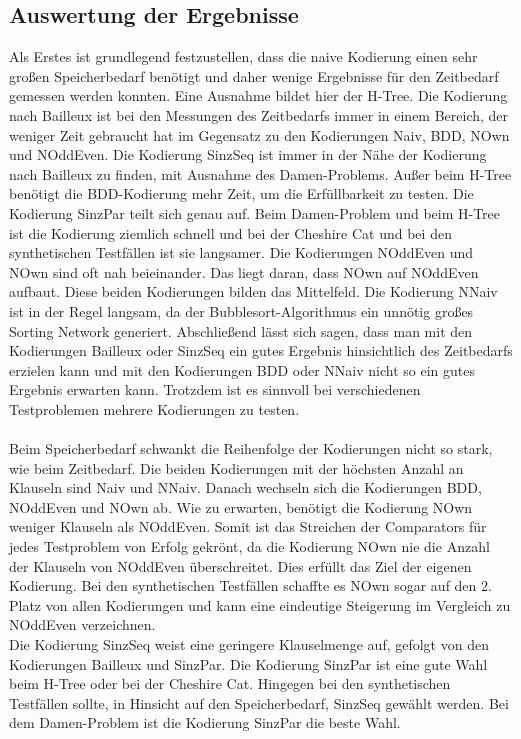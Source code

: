 \documentclass[a4,abstract=on]{scrartcl}
\begin{document}
\subsection{Auswertung der Ergebnisse}
Als Erstes ist grundlegend festzustellen, dass die naive Kodierung einen sehr großen Speicherbedarf benötigt und daher wenige Ergebnisse für den Zeitbedarf gemessen werden konnten. Eine Ausnahme bildet hier der H-Tree. Die Kodierung nach Bailleux ist bei den Messungen des Zeitbedarfs immer in einem Bereich, der weniger Zeit gebraucht hat im Gegensatz zu den Kodierungen Naiv, BDD, NOwn und NOddEven. Die Kodierung SinzSeq ist immer in der Nähe der Kodierung nach Bailleux zu finden, mit Ausnahme des Damen-Problems. Außer beim H-Tree benötigt die BDD-Kodierung mehr Zeit, um die Erfüllbarkeit zu testen. Die Kodierung SinzPar teilt sich genau auf. Beim Damen-Problem und beim H-Tree ist die Kodierung ziemlich schnell und bei der Cheshire Cat und bei den synthetischen Testfällen ist sie langsamer. Die Kodierungen NOddEven und NOwn sind oft nah beieinander. Das liegt daran, dass NOwn auf NOddEven aufbaut. Diese beiden Kodierungen bilden das Mittelfeld. Die Kodierung NNaiv ist in der Regel langsam, da der Bubblesort-Algorithmus ein unnötig großes Sorting Network generiert. Abschließend lässt sich sagen, dass man mit den Kodierungen Bailleux oder SinzSeq ein gutes Ergebnis hinsichtlich des Zeitbedarfs erzielen kann und mit den Kodierungen BDD oder NNaiv nicht so ein gutes Ergebnis erwarten kann. Trotzdem ist es sinnvoll bei verschiedenen Testproblemen mehrere Kodierungen zu testen.\\
\ \\
Beim Speicherbedarf schwankt die Reihenfolge der Kodierungen nicht so stark, wie beim Zeitbedarf. Die beiden Kodierungen mit der höchsten Anzahl an Klauseln sind Naiv und NNaiv. Danach wechseln sich die Kodierungen BDD, NOddEven und NOwn ab. Wie zu erwarten, benötigt die Kodierung NOwn weniger Klauseln als NOddEven. Somit ist das Streichen der Comparators für jedes Testproblem von Erfolg gekrönt, da die Kodierung NOwn nie die Anzahl der Klauseln von NOddEven überschreitet. Dies erfüllt das Ziel der eigenen Kodierung. Bei den synthetischen Testfällen schaffte es NOwn sogar auf den $2.$ Platz von allen Kodierungen und kann eine eindeutige Steigerung im Vergleich zu NOddEven verzeichnen.\\
Die Kodierung SinzSeq weist eine geringere Klauselmenge auf, gefolgt von den Kodierungen Bailleux und SinzPar. Die Kodierung SinzPar ist eine gute Wahl beim H-Tree oder bei der Cheshire Cat. Hingegen bei den synthetischen Testfällen sollte, in Hinsicht auf den Speicherbedarf,  SinzSeq  gewählt werden. Bei dem Damen-Problem ist die Kodierung SinzPar die beste Wahl. \\
\end{document}
